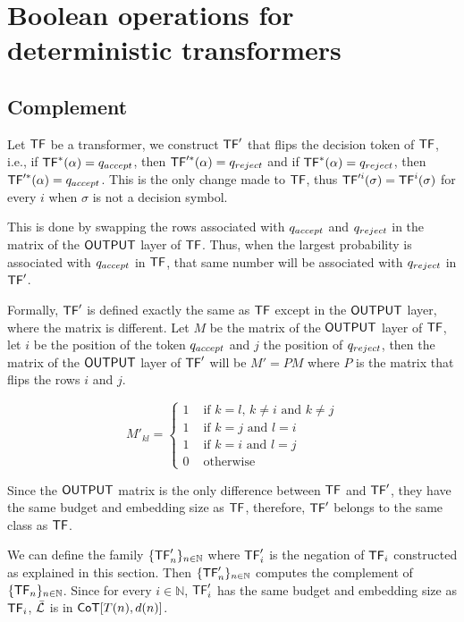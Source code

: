 \chapter{Boolean operations for deterministic transformers}

\section{Complement}\label{appendix:det-not}

Let $\mathsf{TF}$ be a transformer, we construct $\mathsf{TF}'$ that flips the decision token of $\mathsf{TF}$, i.e., if $\mathsf{TF}^*(\alpha) = q_{accept}$, then $\mathsf{TF}'^*(\alpha) = q_{reject}$ and if $\mathsf{TF}^*(\alpha) = q_{reject}$, then $\mathsf{TF}'^*(\alpha) = q_{accept}$.
This is the only change made to $\mathsf{TF}$, thus $\mathsf{TF}'^i(\sigma) = \mathsf{TF}^i(\sigma)$ for every $i$ when $\sigma$ is not a decision symbol.

This is done by swapping the rows associated with $q_{accept}$ and $q_{reject}$ in the matrix of the $\mathsf{OUTPUT}$ layer of $\mathsf{TF}$.
Thus, when the largest probability is associated with $q_{accept}$ in $\mathsf{TF}$, that same number will be associated with $q_{reject}$ in $\mathsf{TF}'$.

Formally, $\mathsf{TF}'$ is defined exactly the same as $\mathsf{TF}$ except in the $\mathsf{OUTPUT}$ layer, where the matrix is different.
Let $M$ be the matrix of the $\mathsf{OUTPUT}$ layer of $\mathsf{TF}$, let $i$ be the position of the token $q_{accept}$ and $j$ the position of $q_{reject}$, then the matrix of the $\mathsf{OUTPUT}$ layer of $\mathsf{TF}'$ will be $M' = PM$ where $P$ is the matrix that flips the rows $i$ and $j$.

\[
    M'_{kl} = \begin{cases}
        1 & \text{ if } k = l \text{, } k \neq i \text{ and } k \neq j \\
        1 & \text{ if } k = j \text{ and } l = i \\
        1 & \text{ if } k = i \text{ and } l = j \\
        0 & \text{ otherwise}
    \end{cases}
\]

Since the $\mathsf{OUTPUT}$ matrix is the only difference between $\mathsf{TF}$ and $\mathsf{TF}'$, they have the same budget and embedding size as $\mathsf{TF}$, therefore, $\mathsf{TF}'$ belongs to the same class as $\mathsf{TF}$.

\medskip

We can define the family $\{\mathsf{TF}'_n\}_{n \in \mathbb{N}}$ where $\mathsf{TF}'_i$ is the negation of $\mathsf{TF}_i$ constructed as explained in this section.
Then $\{\mathsf{TF}'_n\}_{n \in \mathbb{N}}$ computes the complement of $\{\mathsf{TF}_n\}_{n \in \mathbb{N}}$.
Since for every $i \in \mathbb{N}$, $\mathsf{TF}'_i$ has the same budget and embedding size as $\mathsf{TF}_i$, $\bar{\mathcal{L}}$ is in $\mathsf{CoT}[T(n), d(n)]$.


